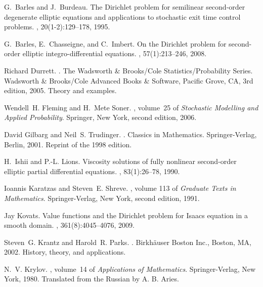 \documentclass[11pt,reqno]{amsart}
\numberwithin{equation}{section}
\begin{document}

\begin{thebibliography}{10}

G.~Barles and J.~Burdeau.
\newblock The {D}irichlet problem for semilinear second-order degenerate
  elliptic equations and applications to stochastic exit time control problems.
, 20(1-2):129--178, 1995.

G.~Barles, E.~Chasseigne, and C.~Imbert.
\newblock On the {D}irichlet problem for second-order elliptic
  integro-differential equations.
, 57(1):213--246, 2008.

Richard Durrett.
.
\newblock The Wadsworth \& Brooks/Cole Statistics/Probability Series. Wadsworth
  \& Brooks/Cole Advanced Books \& Software, Pacific Grove, CA, 3rd edition,
  2005.
\newblock Theory and examples.

Wendell~H. Fleming and H.~Mete Soner.
,
  volume~25 of {\em Stochastic Modelling and Applied Probability}.
\newblock Springer, New York, second edition, 2006.

David Gilbarg and Neil~S. Trudinger.
.
\newblock Classics in Mathematics. Springer-Verlag, Berlin, 2001.
\newblock Reprint of the 1998 edition.

H.~Ishii and P.-L. Lions.
\newblock Viscosity solutions of fully nonlinear second-order elliptic partial
  differential equations.
, 83(1):26--78, 1990.

Ioannis Karatzas and Steven~E. Shreve.
, volume 113 of {\em
  Graduate Texts in Mathematics}.
\newblock Springer-Verlag, New York, second edition, 1991.

Jay Kovats.
\newblock Value functions and the {D}irichlet problem for {I}saacs equation in
  a smooth domain.
, 361(8):4045--4076, 2009.

Steven~G. Krantz and Harold~R. Parks.
.
\newblock Birkh\"auser Boston Inc., Boston, MA, 2002.
\newblock History, theory, and applications.

N.~V. Krylov.
, volume~14 of {\em Applications
  of Mathematics}.
\newblock Springer-Verlag, New York, 1980.
\newblock Translated from the Russian by A. B. Aries.


\end{thebibliography}
\end{document}
